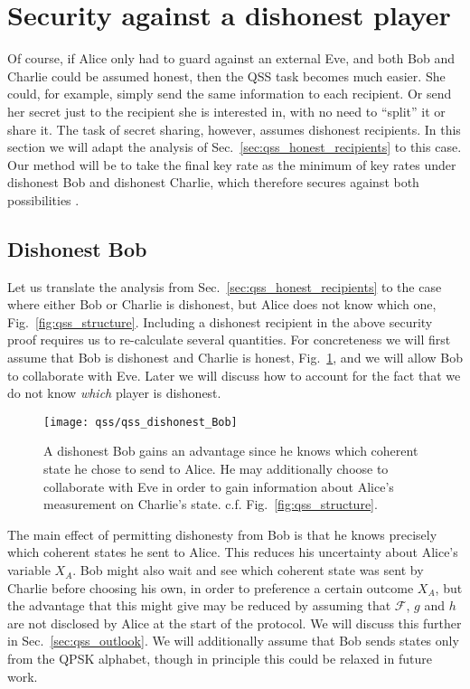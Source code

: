 \section{Security against a dishonest player}\label{sec:qss_dishonest_recipient}
Of course, if Alice only had to guard against an external Eve, and both Bob and Charlie could be assumed honest, then the QSS task becomes much easier. She could, for example, simply send the same information to each recipient. Or send her secret just to the recipient she is interested in, with no need to ``split'' it or share it. The task of secret sharing, however, assumes dishonest recipients. In this section we will adapt the analysis of Sec.~\ref{sec:qss_honest_recipients} to this case. Our method will be to take the final key rate as the minimum of key rates under dishonest Bob and dishonest Charlie, which therefore secures against both possibilities \cite{Kogias2017, Grice2019}. 

\subsection{Dishonest Bob}
Let us translate the analysis from Sec.~\ref{sec:qss_honest_recipients} to the case where either Bob or Charlie is dishonest, but Alice does not know which one, Fig.~\ref{fig:qss_structure}. Including a dishonest recipient in the above security proof requires us to re-calculate several quantities. For concreteness we will first assume that Bob is dishonest and Charlie is honest, Fig.~\ref{fig:qss_dishonest_Bob}, and we will allow Bob to collaborate with Eve. Later we will discuss how to account for the fact that we do not know \emph{which} player is dishonest.

\begin{figure}[htp]
\captionsetup{width=\linewidth}
\centering
\texttt{[image: qss/qss\_dishonest\_Bob]}
\caption{\label{fig:qss_dishonest_Bob} A dishonest Bob gains an advantage since he knows which coherent state he chose to send to Alice. He may additionally choose to collaborate with Eve in order to gain information about Alice's measurement on Charlie's state. c.f. Fig.~\ref{fig:qss_structure}.}
\end{figure}

The main effect of permitting dishonesty from Bob is that he knows precisely which coherent states he sent to Alice. This reduces his uncertainty about Alice's variable $X_A$. Bob might also wait and see which coherent state was sent by Charlie before choosing his own, in order to preference a certain outcome $X_A$, but the advantage that this might give may be reduced by assuming that $\mathcal{F}$, $g$ and $h$ are not disclosed by Alice at the start of the protocol. We will discuss this further in Sec.~\ref{sec:qss_outlook}. We will additionally assume that Bob sends states only from the QPSK alphabet, though in principle this could be relaxed in future work.


